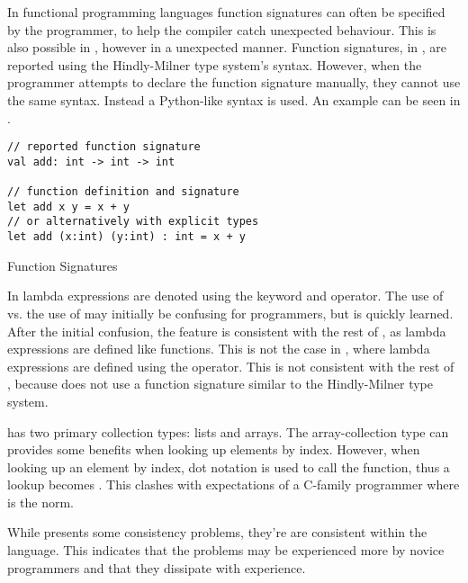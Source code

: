 In functional programming languages function signatures can often be specified by the programmer, to help the compiler catch unexpected behaviour. This is also possible in \fs, however in a unexpected manner. Function signatures, in \fs, are reported using the Hindly-Milner type system's syntax\cite{fsharp:type:inference}. However, when the programmer attempts to declare the function signature manually, they cannot use the same syntax. Instead a Python-like syntax is used. An example can be seen in .

\begin{listing}[H]
\begin{verbatim}
// reported function signature
val add: int -> int -> int

// function definition and signature
let add x y = x + y
// or alternatively with explicit types
let add (x:int) (y:int) : int = x + y
\end{verbatim}
\caption{Function Signatures}
\label{lst:fun-sig}
\end{listing}

In \fs lambda expressions are denoted using the  keyword and \ttt{-\textgreater} operator. The use of  vs. the use of  may initially be confusing for programmers, but is quickly learned. After the initial confusion, the feature is consistent with the rest of \fs, as lambda expressions are defined like functions. This is not the case in \cs, where lambda expressions are defined using the \ttt{=\textgreater} operator. This is not consistent with the rest of \cs, because \cs does not use a function signature similar to the Hindly-Milner type system.

\fs has two primary collection types: lists and arrays. The array-collection type can provides some benefits when looking up elements by index.  However, when looking up an element by index, dot notation is used to call the \ttt{[]} function, thus a lookup becomes . This clashes with expectations of a C-family programmer where  is the norm.

While \fs presents some consistency problems, they're are consistent within the language. This indicates that the problems may be experienced more by novice programmers and that they dissipate with experience.
